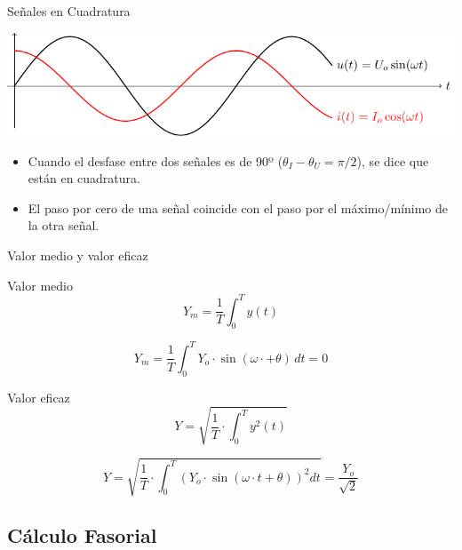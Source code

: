 \documentclass[xcolor={usenames,svgnames,dvipsnames}]{beamer}
\begin{document}
\begin{frame}[label={sec:orgf58b8f9}]{Señales en Cuadratura}
\begin{center}
\includegraphics[width=.9\linewidth]{../figs/cuadratura.pdf}
\end{center}

\begin{itemize}
\item Cuando el desfase entre dos señales es de 90º (\(\theta_I - \theta_U = \pi/2\)), se dice que están en cuadratura.
\item El paso por cero de una señal coincide con el paso por el máximo/mínimo de la otra señal.
\end{itemize}
\end{frame}


\begin{frame}[label={sec:orgdfad6bc}]{Valor medio y valor eficaz}
\begin{block}{Valor medio}
\[
Y_m=\frac{1}{T}\int_{0}^{T}y(t)
\]

\[
Y_m=\frac{1}{T}\int_{0}^{T}Y_{o}\cdot\sin(\omega\cdot+\theta)\, dt=0
\]
\end{block}
\begin{block}{Valor eficaz}
\[
Y = \sqrt{\frac{1}{T}\cdot\int_{0}^{T}y^{2}(t)}
\]

\[
Y=\sqrt{\frac{1}{T}\cdot\int_{0}^{T}\left(Y_{o}\cdot\sin(\omega\cdot t+\theta)\right)^{2}dt}=\frac{Y_{o}}{\sqrt{2}}
\]
\end{block}
\end{frame}
\subsection{Cálculo Fasorial}
\label{sec:org1ad8285}
\end{document}
